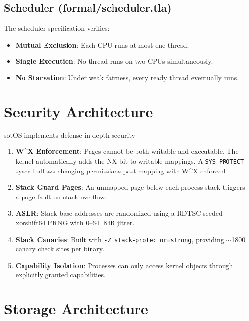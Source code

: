 \documentclass[11pt,letterpaper]{article}
\theoremstyle{definition}
\begin{document}
\subsection{Scheduler (formal/scheduler.tla)}

The scheduler specification verifies:
\begin{itemize}[nosep]
    \item \textbf{Mutual Exclusion}: Each CPU runs at most one thread.
    \item \textbf{Single Execution}: No thread runs on two CPUs simultaneously.
    \item \textbf{No Starvation}: Under weak fairness, every ready thread
          eventually runs.
\end{itemize}

\section{Security Architecture}
\label{sec:security}

sotOS implements defense-in-depth security:

\begin{enumerate}[nosep]
    \item \textbf{W\^{}X Enforcement}: Pages cannot be both writable and
          executable. The kernel automatically adds the NX bit to writable
          mappings. A \texttt{SYS\_PROTECT} syscall allows changing permissions
          post-mapping with W\^{}X enforced.
    \item \textbf{Stack Guard Pages}: An unmapped page below each process
          stack triggers a page fault on stack overflow.
    \item \textbf{ASLR}: Stack base addresses are randomized using a
          RDTSC-seeded xorshift64 PRNG with 0--64~KiB jitter.
    \item \textbf{Stack Canaries}: Built with \texttt{-Z stack-protector=strong},
          providing $\sim$1800 canary check sites per binary.
    \item \textbf{Capability Isolation}: Processes can only access kernel
          objects through explicitly granted capabilities.
\end{enumerate}

\section{Storage Architecture}
\label{sec:storage}
\end{document}
